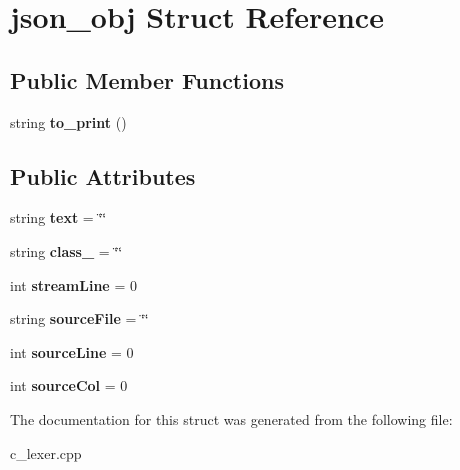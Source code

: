 \hypertarget{structjson__obj}{}\section{json\+\_\+obj Struct Reference}
\label{structjson__obj}
\subsection*{Public Member Functions}
\begin{DoxyCompactItemize}
\item 
\mbox{\label{structjson__obj_ac060ccd9342d0907f45bc0d02a3889e0}} 
string {\bfseries to\+\_\+print} ()
\end{DoxyCompactItemize}
\subsection*{Public Attributes}
\begin{DoxyCompactItemize}
\item 
\mbox{\label{structjson__obj_a1bab31ab3b593bd6bf6c7948a817c330}} 
string {\bfseries text} = \char`\"{}\char`\"{}
\item 
\mbox{\label{structjson__obj_a9a34007fff15c94c9c868563d960fad2}} 
string {\bfseries class\+\_\+} = \char`\"{}\char`\"{}
\item 
\mbox{\label{structjson__obj_afedfe1b83d34118ac2e8cabcd76ae575}} 
int {\bfseries stream\+Line} = 0
\item 
\mbox{\label{structjson__obj_ad391b9438655833d64eb608c946876ca}} 
string {\bfseries source\+File} = \char`\"{}\char`\"{}
\item 
\mbox{\label{structjson__obj_a17a2555d0f7accf0e9955ca75962e7bf}} 
int {\bfseries source\+Line} = 0
\item 
\mbox{\label{structjson__obj_a62e4cdcb3c699df8b272644afb06c564}} 
int {\bfseries source\+Col} = 0
\end{DoxyCompactItemize}


The documentation for this struct was generated from the following file\+:\begin{DoxyCompactItemize}
\item 
c\+\_\+lexer.\+cpp\end{DoxyCompactItemize}
